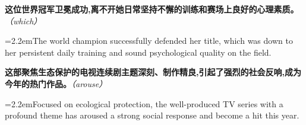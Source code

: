 \documentclass[11pt,a4paper]{article}
\newcommand{\num}[1]{\makebox[1.9em][r]{#1.}\hspace{0.3em}}
\newcommand{\prompt}[1]{\emph{\textcolor{tipblue}{\small（#1）}}}
\begin{document}
\begin{minipage}{\linewidth}

\num{3}\textbf{这位世界冠军卫冕成功,离不开她日常坚持不懈的训练和赛场上良好的心理素质。}\prompt{which}

\vspace{0.15em}

\noindent\hangindent=2.2em\hspace{2.2em}The world champion successfully defended her title, which was down to her persistent daily training and sound psychological quality on the field.

\end{minipage}

\begin{minipage}{\linewidth}

\num{4}\textbf{这部聚焦生态保护的电视连续剧主题深刻、制作精良,引起了强烈的社会反响,成为今年的热门作品。}\prompt{arouse}

\vspace{0.15em}

\noindent\hangindent=2.2em\hspace{2.2em}Focused on ecological protection, the well-produced TV series with a profound theme has aroused a strong social response and become a hit this year.

\end{minipage}
\end{document}
